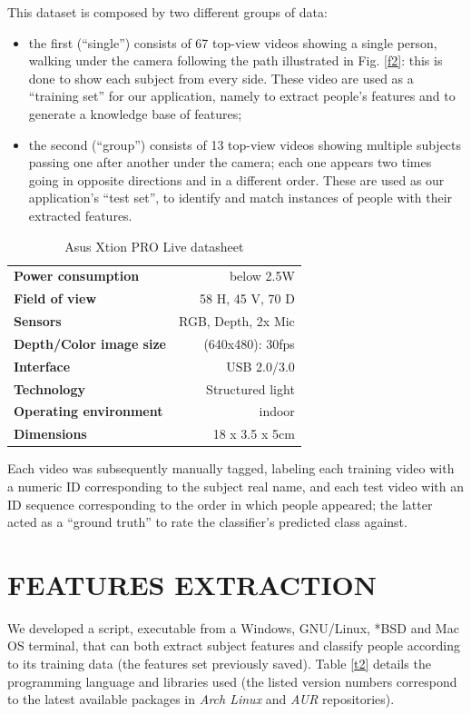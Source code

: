 \documentclass[letterpaper, 11pt, conference]{ieeeconf} %
\begin{document}
This dataset is composed by two different groups of data\cite{c2}\cite{c7}:

\begin{itemize}
\item the first (``single'') consists of 67 top-view videos showing a single person, walking under the camera following the path illustrated in Fig. \ref{f2}: this is done to show each subject from every side. These video are used as a ``training set'' for our application, namely to extract people's features and to generate a knowledge base of features;
\item the second (``group'') consists of 13 top-view videos showing multiple subjects passing one after another under the camera; each one appears two times going in opposite directions and in a different order. These are used as our application's ``test set'', to identify and match instances of people with their extracted features.
\end{itemize}

\begin{table}[h]
\centering
\begin{tabular}{lr}
	\textbf{Power consumption} & below 2.5W\\
	\textbf{Field of view} & 58 H, 45 V, 70 D\\
	\textbf{Sensors} & RGB, Depth, 2x Mic\\
	\textbf{Depth\slash Color image size} & (640x480): 30fps\\
	\textbf{Interface} & USB 2.0\slash 3.0\\
	\textbf{Technology} & Structured light\cite{c6}\\
	\textbf{Operating environment} & indoor\\
	\textbf{Dimensions} & 18 x 3.5 x 5cm\\
\end{tabular}
\caption{Asus Xtion PRO Live datasheet} \label{t1}
\vspace{-1.5em}
\end{table}

Each video was subsequently manually tagged, labeling each training video with a numeric ID corresponding to the subject real name, and each test video with an ID sequence corresponding to the order in which people appeared; the latter acted as a ``ground truth'' to rate the classifier's predicted class against.

\section{FEATURES EXTRACTION} \label{s3}
We developed a script, executable from a Windows, GNU\slash Linux, *BSD and Mac OS terminal, that can both extract subject features and classify people according to its training data (the features set previously saved). Table \ref{t2} details the programming language and libraries used (the listed version numbers correspond to the latest available packages in \emph{Arch Linux} and \emph{AUR} repositories).
\end{document}

